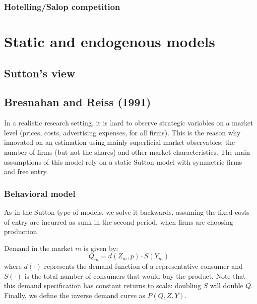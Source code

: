 \documentclass[12pt]{report}
\begin{document}
\subsubsection{Hotelling/Salop competition}



\section{Static and endogenous models}

\subsection{Sutton's view}



\subsection{Bresnahan and Reiss (1991)}

In a realistic research setting, it is hard to observe strategic variables on a market level (prices, costs, advertising expenses, for all firms). This is the reason why \cite{br_91} innovated on an estimation using mainly superficial market observables: the number of firms (but not the shares) and other market characteristics. The main assumptions of this model rely on a static Sutton model with symmetric firms and free entry.

\subsubsection{Behavioral model}

As in the Sutton-type of models, we solve it backwards, assuming the fixed costs of entry are incurred as sunk in the second period, when firms are choosing production.

Demand in the market $m$ is given by: $$ Q_m = d(Z_m, p)\cdot S(Y_m) $$ where $d(\cdot)$ represents the demand function of a representative consumer and $S(\cdot)$ is the total number of consumers that would buy the product. Note that this demand specification has constant returns to scale: doubling $S$ will double $Q$. Finally, we define the inverse demand curve as $P(Q, Z, Y)$.
\end{document}
